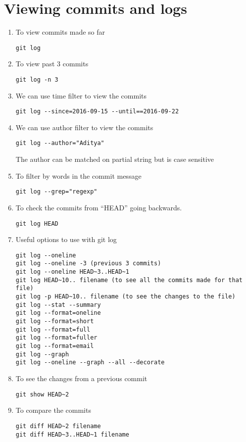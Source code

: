\documentclass[paper=a4, fontsize=12pt]{scrartcl}
\begin{document}
\section*{Viewing commits and logs}
\begin{enumerate}
\item To view commits made so far
\begin{lstlisting}
git log
\end{lstlisting}
\item To view past $3$ commits
\begin{lstlisting}
git log -n 3
\end{lstlisting}
\item We can use time filter to view the commits
\begin{lstlisting}
git log --since=2016-09-15 --until==2016-09-22
\end{lstlisting}
\item We can use author filter to view the commits
\begin{lstlisting}
git log --author="Aditya"
\end{lstlisting}
The author can be matched on partial string but is case sensitive
\item To filter by words in the commit message
\begin{lstlisting}
git log --grep="regexp"
\end{lstlisting}
\item To check the commits from ``HEAD'' going backwards.
\begin{lstlisting}
git log HEAD
\end{lstlisting}
\item Useful options to use with git log
\begin{lstlisting}
git log --oneline
git log --oneline -3 (previous 3 commits)
git log --oneline HEAD~3..HEAD~1
git log HEAD~10.. filename (to see all the commits made for that file)
git log -p HEAD~10.. filename (to see the changes to the file)
git log --stat --summary
git log --format=oneline
git log --format=short
git log --format=full
git log --format=fuller
git log --format=email
git log --graph
git log --oneline --graph --all --decorate
\end{lstlisting}
\item To see the changes from a previous commit
\begin{lstlisting}
git show HEAD~2
\end{lstlisting}
\item To compare the commits
\begin{lstlisting}
git diff HEAD~2 filename
git diff HEAD~3..HEAD~1 filename
\end{lstlisting}
\end{enumerate}
\end{document}
